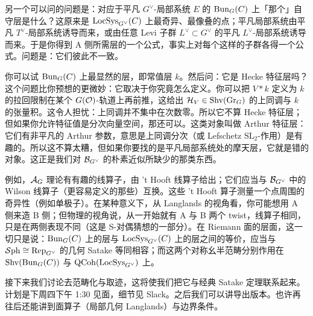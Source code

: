 另一个可以问的问题是：对应于平凡 $G^\vee$-局部系统 $E$ 的 $\mathrm{Bun}_G(C)$ 上「那个」自守层是什么？这原来是 $\mathrm{LocSys}_{G^\vee}(C)$ 上最奇异、最像叠的点；平凡局部系统由平凡 $T^\vee$-局部系统诱导而来，或由任意 Levi 子群 $L^\vee\subset G^\vee$ 的平凡 $L^\vee$-局部系统诱导而来。于是你得到 A 侧所需层的一个公式，事实上对每个这样的子群各得一个公式。问题是：它们彼此不一致。

你可以试 $\mathrm{Bun}_G(C)$ 上最显然的层，即常值层 $k$。然后问：它是 Hecke 特征层吗？这个问题比你预想的更微妙：它取决于你究竟怎么定义。你可以把 $V*k$ 定义为 $k$ 的拉回限制在某个 $G(\mathcal{O})$-轨道上再前推，这给出 $\mathcal{H}_V\in\mathrm{Shv}(\mathrm{Gr}_G)$ 的上同调与 $k$ 的张量积。这令人担忧：上同调并不集中在次数零。所以它不算 Hecke 特征层；但如果你允许特征值是分次向量空间，那还可以。这类对象叫做 Arthur 特征层：它们有非平凡的 Arthur 参数，意思是上同调分次（或 Lefschetz $\mathrm{SL}_2$-作用）是有趣的。所以这不算太糟，但如果你要找的是平凡局部系统处的摩天层，它就是错的对象。这正是我们对 $\mathcal{B}_{G^\vee}$ 的朴素近似所缺少的那类东西。

例如，$\mathcal{A}_G$ 理论有有趣的线算子，由 't Hooft 线算子给出；它们应当与 $\mathcal{B}_{G^\vee}$ 中的 Wilson 线算子（更容易定义的那些）互换。这些 't Hooft 算子测量一个点周围的奇异性（例如单极子）。在某种意义下，从 Langlands 的视角看，你可能想用 A 侧来造 B 侧；但物理的视角说，从一开始就有 A 与 B 两个 twist，线算子相同，只是在两侧表现不同（这是 S-对偶猜想的一部分）。在 Riemann 面的层面，这一切只是说：$\mathrm{Bun}_G(C)$ 上的层与 $\mathrm{LocSys}_{G^\vee}(C)$ 上的层之间的等价，应当与 $\mathcal{S}\mathrm{ph}\cong\operatorname{Rep}_{G^\vee}$ 的几何 Satake 等同相容；而这两个对称幺半范畴分别作用在 $\mathrm{Shv}(\mathrm{Bun}_G(C))$ 与 $\mathrm{QCoh}(\mathrm{LocSys}_{G^\vee})$ 上。

接下来我们讨论去范畴化与取迹，这将使我们把它与经典 Satake 定理联系起来。计划是下周四下午 1:30 见面，细节见 Slack。之后我们可以讲导出版本。也许再往后还能讲到面算子（局部几何 Langlands）与边界条件。
